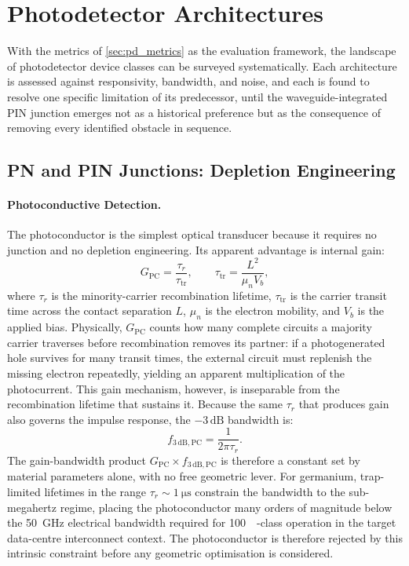 \section[Photodetector Architectures]{Photodetector Architectures}
\label{sec:pd_architectures}

With the metrics of \cref{sec:pd_metrics} as the evaluation framework, the
landscape of photodetector device classes can be surveyed systematically. Each
architecture is assessed against responsivity, bandwidth, and noise, and each
is found to resolve one specific limitation of its predecessor, until the
waveguide-integrated PIN junction emerges not as a historical preference but as
the consequence of removing every identified obstacle in sequence.

\subsection[PN and PIN Junctions]{PN and PIN Junctions: Depletion Engineering}
\label{subsec:pd_pn_pin}

\paragraph{Photoconductive Detection.}
The photoconductor is the simplest optical transducer because it requires no
junction and no depletion engineering. Its apparent advantage is internal gain:
\begin{equation}
    G_{\mathrm{PC}} = \frac{\tau_r}{\tau_{\mathrm{tr}}},
    \qquad
    \tau_{\mathrm{tr}} = \frac{L^2}{\mu_n V_b},
    \label{eq:pc_gain}
\end{equation}
where $\tau_r$ is the minority-carrier recombination lifetime, $\tau_{\mathrm{tr}}$
is the carrier transit time across the contact separation $L$, $\mu_n$ is the
electron mobility, and $V_b$ is the applied bias. Physically, $G_{\mathrm{PC}}$
counts how many complete circuits a majority carrier traverses before
recombination removes its partner: if a photogenerated hole survives for
many transit times, the external circuit must replenish the missing electron
repeatedly, yielding an apparent multiplication of the photocurrent. This gain
mechanism, however, is inseparable from the recombination lifetime that sustains
it. Because the same $\tau_r$ that produces gain also governs the impulse
response, the $-3\,\mathrm{dB}$ bandwidth is:
\begin{equation}
    f_{3\,\mathrm{dB,PC}} = \frac{1}{2\pi\tau_r}.
    \label{eq:pc_bw}
\end{equation}
The gain-bandwidth product $G_{\mathrm{PC}}\times f_{3\,\mathrm{dB,PC}}$ is
therefore a constant set by material parameters alone, with no free geometric
lever. For germanium, trap-limited lifetimes in the range
$\tau_r\sim\SI{1}{\micro\second}$ constrain the bandwidth to the
sub-megahertz regime, placing the photoconductor many orders of magnitude below
the \SI{50}{\giga\hertz} electrical bandwidth required for
\SI{100}{\giga\baud}-class operation in the target data-centre interconnect
context. The photoconductor is therefore rejected by this intrinsic constraint
before any geometric optimisation is considered.

